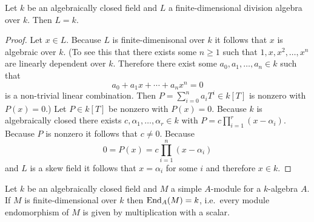 \begin{lem}
 Let $k$ be an algebraically closed field and $L$ a finite-dimensional division algebra over $k$. Then $L = k$.
\end{lem}
\begin{proof}
 Let $x \in L$. Because $L$ is finite-dimenisonal over $k$ it follows that $x$ is algebraic over $k$. (To see this that there exists some $n \geq 1$ such that $1, x, x^2, \dotsc, x^n$ are linearly dependent over $k$. Therefore there exist some $a_0, a_1, \dotsc, a_n \in k$ such that
 \[
  a_0 + a_1 x + \dotsb + a_n x^n = 0
 \]
 is a non-trivial linear combination. Then $P = \sum_{i=0}^n a_i T^i \in k[T]$ is nonzero with $P(x) = 0$.) Let $P \in k[T]$ be nonzero with $P(x) = 0$. Because $k$ is algebraically closed there exists $c, \alpha_1, \dotsc, \alpha_r \in k$ with $P = c \prod_{i=1}^r (x-\alpha_i)$. Because $P$ is nonzero it follows that $c \neq 0$. Because
 \[
  0 = P(x) = c \prod_{i=1}^n (x-\alpha_i)
 \]
 and $L$ is a skew field it follows that $x = \alpha_i$ for some $i$ and therefore $x \in k$.
\end{proof}


\begin{cor}[Schur]
 Let $k$ be an algebraically closed field and $M$ a simple $A$-module for a $k$-algebra $A$. If $M$ is finite-dimensional over $k$ then $\operatorname{End}_A(M) = k$, i.e.\ every module endomorphism of $M$ is given by multiplication with a scalar.
\end{cor}




